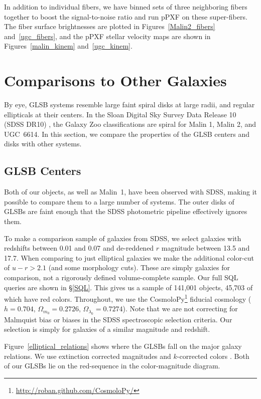 \documentclass[12pt,preprint]{aastex}
\begin{document}
In addition to individual fibers, we have binned sets of three neighboring fibers together to boost the signal-to-noise ratio and run pPXF on these super-fibers. The fiber surface brightnesses are plotted in Figures~\ref{Malin2_fibers} and~\ref{ugc_fibers}, and the pPXF stellar velocity maps are shown in Figures~\ref{malin_kinem} and~\ref{ugc_kinem}.



\section{Comparisons to Other Galaxies}\label{sec:compare_gals}

By eye, GLSB systems resemble large faint spiral disks at large radii, and regular ellipticals at their centers.
In the Sloan Digital Sky Survey Data Release 10 (SDSS DR10) \citep{Ahn14}, the Galaxy Zoo classifications \citep{Willett13} are spiral for Malin 1, Malin 2, and UGC~6614.
In this section, we compare the properties of the GLSB centers and disks with other systems.


\subsection{GLSB Centers}\label{sec:centers}

Both of our objects, as well as Malin~1, have been observed with SDSS, making it possible to compare them to a large number of systems.
The outer disks of GLSBs are faint enough that the SDSS photometric pipeline effectively ignores them.


To make a comparison sample of galaxies from SDSS, we select galaxies with redshifts between 0.01 and 0.07 and de-reddened $r$ magnitude between 13.5 and 17.7.
When comparing to just elliptical galaxies we make the additional color-cut of $u-r > 2.1$ (and some morphology cuts).
These are simply galaxies for comparison, not a rigorously defined volume-complete sample.
Our full SQL queries are shown in \S\ref{SQL}.
This gives us a sample of 141,001 objects, 45,703 of which have red colors.
Throughout, we use the CosmoloPy\footnote{\url{http://roban.github.com/CosmoloPy/}} fiducial cosmology ($h=0.704$, $\Omega_{m_0}=0.2726$, $\Omega_{\lambda_0}=0.7274$).
Note that we are not correcting for Malmquist bias or biases in the SDSS spectroscopic selection criteria.
Our selection is simply for galaxies of a similar magnitude and redshift.


Figure~\ref{elliptical_relations} shows where the GLSBs fall on the major galaxy relations.
We use extinction corrected magnitudes and $k$-corrected colors \citep{Chilingarian10}.
Both of our GLSBs lie on the red-sequence in the color-magnitude diagram.
\end{document}
